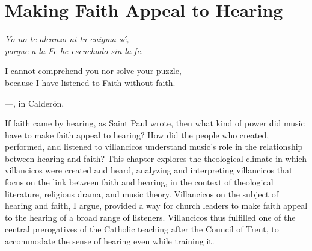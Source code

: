 
%
%
%


\chapter{Making Faith Appeal to Hearing}
\label{ch:faith-hearing}

\begin{epigraph}
    \emph{Yo no te alcanzo ni tu enigma sé,} \\
    \emph{porque a la Fe he escuchado sin la fe.} \\
    \addlinespace

    I cannot comprehend you nor solve your puzzle, \\
    because I have listened to Faith without faith. \\
    \addlinespace

    ---, in Calderón, %
        \Autocite[]{Calderon:Retiro} %
\end{epigraph}

If faith came by hearing, as Saint Paul wrote, then what kind of power did music
have to make faith appeal to hearing?
How did the people who created, performed, and listened to villancicos
understand music's role in the relationship between hearing and faith?
This chapter explores the theological climate in which villancicos were created
and heard, analyzing and interpreting villancicos that focus on the link between
faith and hearing, in the context of theological literature, religious drama,
and music theory.
Villancicos on the subject of hearing and faith, I argue, provided a way for
church leaders to make faith appeal to the hearing of a broad range of
listeners.
Villancicos thus fulfilled one of the central prerogatives of the Catholic
teaching after the Council of Trent, to accommodate the sense of
hearing even while training it.

